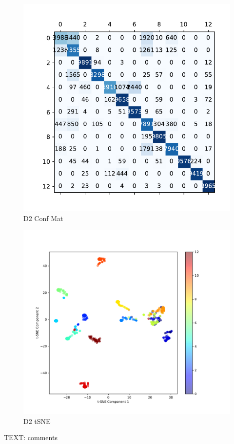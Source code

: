 \documentclass{article}
\begin{document}
			\begin{figure}[htbp]
				\centering
				\includegraphics[width=\linewidth]{Figs/diagnosis2_confusion_matrix.pdf}
				\caption{D2 Conf Mat}
				\vspace{0.3cm}
				\label{fig:D2_conf_mat}
			\end{figure}
			\begin{figure}[htbp]
				\centering
				\includegraphics[width=\linewidth]{Figs/diagnosis2_tSNE.pdf}
				\caption{D2 tSNE}
				\vspace{0.3cm}
				\label{fig:D2_tSNE}
			\end{figure}
			TEXT: comments
			
\end{document}
